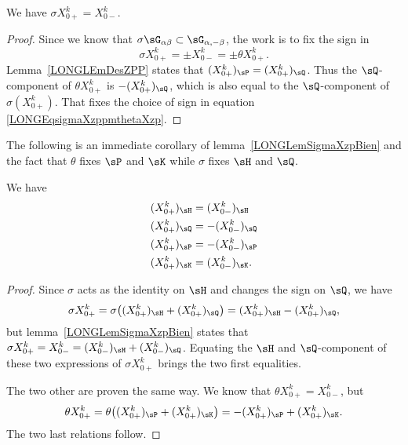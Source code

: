 \begin{lemma}				\label{LONGLemSigmaXzpBien}
	We have $\sigma X^k_{0+}=X^k_{0-}$.
\end{lemma}

\begin{proof}
	Since we know that $\sigma\sG_{\alpha\beta}\subset\sG_{\alpha,-\beta}$, the work is to fix the sign in
	\begin{equation}		\label{LONGEqsigmaXzppmthetaXzp}
		\sigma X^k_{0+}=\pm X^k_{0-}=\pm\theta X^k_{0+}.
	\end{equation}
	Lemma~\ref{LONGLEmDesZPP} states that $(X_{0+}^k)_{\sP}=(X_{0+}^k)_{\sQ}$. Thus the $\sQ$-component of $\theta X^k_{0+}$ is $-(X^k_{0+})_{\sQ}$, which is also equal to the $\sQ$-component of $\sigma(X^k_{0+})$. That  fixes the choice of sign in equation \eqref{LONGEqsigmaXzppmthetaXzp}.
\end{proof}

The following is an immediate corollary of lemma~\ref{LONGLemSigmaXzpBien} and the fact that $\theta$ fixes $\sP$ and $\sK$ while $\sigma$ fixes $\sH$ and $\sQ$.

\begin{corollary}		\label{LONGCorXzpHQPKXzm}
	We have
	\begin{subequations}
		\begin{align}
			(X^k_{0+})_{\sH}	&=(X^k_{0-})_{\sH}\\
			(X^k_{0+})_{\sQ}	&=-(X^k_{0-})_{\sQ}\\
			(X^k_{0+})_{\sP}	&=-(X^k_{0-})_{\sP}\\
			(X^k_{0+})_{\sK}	&=(X^k_{0-})_{\sK}.
		\end{align}
	\end{subequations}
\end{corollary}

\begin{proof}
	Since $\sigma$ acts as the identity on $\sH$ and changes the sign on $\sQ$, we have
	\begin{equation}
		\sigma X^k_{0+}=\sigma\big(  (X^k_{0+})_{\sH}+(X^k_{0+})_{\sQ}  \big)=(X^k_{0+})_{\sH}-(X^k_{0+})_{\sQ},
	\end{equation}
	but lemma~\ref{LONGLemSigmaXzpBien} states that $\sigma X^k_{0+}=X^k_{0-}=(X^k_{0-})_{\sH}+(X^k_{0-})_{\sQ}$. Equating the $\sH$ and $\sQ$-component of these two expressions of $\sigma X^k_{0+}$ brings the two first equalities.

	The two other are proven the same way. We know that $\theta X^k_{0+}=X^k_{0-}$, but
	\begin{equation}
		\theta X^k_{0+}=\theta\big( (X^k_{0+})_{\sP}+(X^k_{0+})_{\sK} \big)=-(X^k_{0+})_{\sP}+(X^k_{0+})_{\sK}.
	\end{equation}
	The two last relations follow.
\end{proof}

